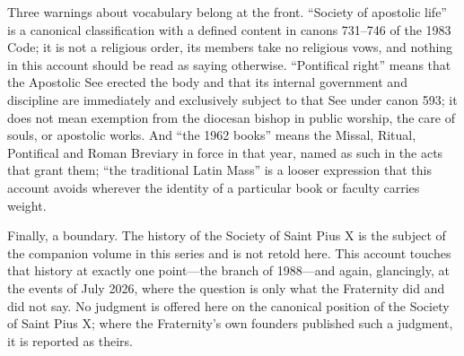 Three warnings about vocabulary belong at the front. ``Society of
apostolic life'' is a canonical classification with a defined content in
canons 731--746 of the 1983 Code; it is not a religious order, its members
take no religious vows, and nothing in this account should be read as
saying otherwise. ``Pontifical right'' means that the Apostolic See
erected the body and that its internal government and discipline are
immediately and exclusively subject to that See under canon 593; it does
not mean exemption from the diocesan bishop in public worship, the care
of souls, or apostolic works. And ``the 1962 books'' means the Missal,
Ritual, Pontifical and Roman Breviary in force in that year, named as
such in the acts that grant them; ``the traditional Latin Mass'' is a
looser expression that this account avoids wherever the identity of a
particular book or faculty carries weight.

Finally, a boundary. The history of the Society of Saint Pius X is the
subject of the companion volume in this series and is not retold here.
This account touches that history at exactly one point---the branch of
1988---and again, glancingly, at the events of July 2026, where the
question is only what the Fraternity did and did not say. No judgment is
offered here on the canonical position of the Society of Saint Pius X;
where the Fraternity's own founders published such a judgment, it is
reported as theirs.
